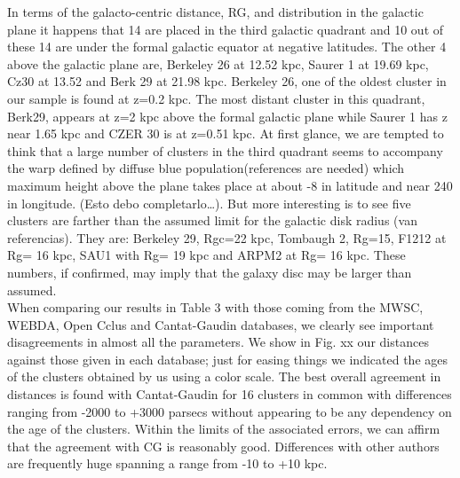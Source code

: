 \documentclass[draft]{aa}
\begin{document}
  In terms of the galacto-centric distance, RG, and distribution in the galactic
  plane it happens that 14 are placed in the third galactic quadrant and 10 out of
  these 14 are under the formal galactic equator at negative latitudes. The other
  4 above the galactic plane are, Berkeley 26 at 12.52 kpc, Saurer 1 at 19.69 kpc,
  Cz30 at 13.52 and Berk 29 at 21.98 kpc.  Berkeley 26, one of the oldest cluster
  in our sample is found at z=0.2 kpc. The most distant cluster in this quadrant,
  Berk29, appears at z=2 kpc above the formal galactic plane while Saurer 1 has z
  near 1.65 kpc and CZER 30 is at z=0.51 kpc.  At first glance, we are tempted to
  think that a large number of clusters in the third quadrant seems to accompany
  the warp defined by diffuse blue population(references are needed) which maximum
  height above the plane takes place at about -8 in latitude and near 240 in longitude.
  (Esto debo completarlo…).
  But more interesting is to see five clusters are farther than the assumed limit
  for the galactic disk radius (van referencias). They are: Berkeley 29, Rgc=22 kpc,
  Tombaugh 2, Rg=15, F1212 at Rg= 16 kpc,  SAU1 with Rg= 19 kpc and ARPM2 at
  Rg= 16 kpc. These numbers, if confirmed, may imply that the galaxy disc may be
  larger than assumed.\\

  When comparing our results in Table 3 with those coming from the MWSC, WEBDA,
  Open Cclus and Cantat-Gaudin databases, we clearly see important disagreements
  in almost all the parameters. We show in Fig. xx our distances against those
  given in each database;  just for easing things we indicated the ages of the
  clusters obtained  by us using a color scale. The best overall agreement in
  distances is found with Cantat-Gaudin for 16 clusters in common with differences
  ranging from -2000 to +3000 parsecs without appearing to be any dependency on
  the age of the clusters.  Within the limits of the associated errors, we can
  affirm that the agreement with CG is reasonably good.  Differences with other
  authors are frequently huge spanning a range from -10 to +10 kpc. 






\end{document}
